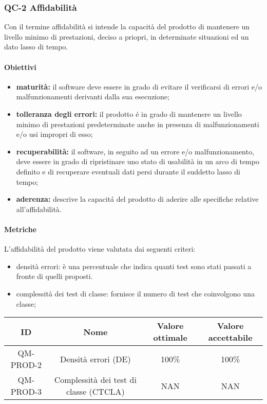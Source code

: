\subsubsection{QC-2 Affidabilità}
Con il termine affidabilità si intende la capacità del prodotto di mantenere un livello minimo di prestazioni, deciso a priopri, in determinate situazioni ed un dato lasso di tempo.
	\paragraph{Obiettivi}
		\begin{itemize}
			\item \textbf{maturità:} il software deve essere in grado di evitare il verificarsi di errori e/o malfunzionamenti derivanti dalla sua esecuzione;
			\item \textbf{tolleranza degli errori:} il prodotto é in grado di mantenere un livello minimo di prestazioni predeterminate anche in presenza di malfunzionamenti e/o usi impropri di esso;
			\item \textbf{recuperabilità:} il software, in seguito ad un errore e/o malfunzionamento, deve essere in grado di ripristinare uno stato di usabilità in un arco di tempo definito e di recuperare eventuali dati persi durante il suddetto lasso di tempo;
			\item \textbf{aderenza:} descrive la capacitá del prodotto di aderire alle specifiche relative all'affidabilità.
		\end{itemize}
	\paragraph{Metriche}
	L'affidabilità del prodotto viene valutata dai seguenti criteri:
	\begin{itemize}
		\item densità errori: è una percentuale che indica quanti test sono stati passati a fronte di quelli proposti.
		\item complessità dei test di classe: fornisce il numero di test che coinvolgono una classe;
	\end{itemize}
	\begin{center}	
		\begin{tabular}{|c|c|c|c|}
			\rowcolor{lighter-grayer}
			\hline
			ID & Nome & Valore ottimale & Valore accettabile \\
			\hline
			QM-PROD-2 & Densità errori (DE) & 100\% & 100\% \\
			\hline
			QM-PROD-3 & Complessità dei test di classe (CTCLA) & NAN & NAN \\
			\hline
		\end{tabular}
	\end{center}
